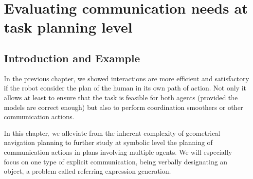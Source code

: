\documentclass[a4paper,11pt,twoside]{StyleThese}
\begin{document}
\setcounter{chapter}{2} %
\dominitoc
\faketableofcontents
\fi

\chapter{Evaluating communication needs at task planning level}
\minitoc
\printnomenclature

\section{Introduction and Example}
In the previous chapter, we showed interactions are more efficient and satisfactory if the robot consider the plan of the human in its own path of action. Not only it allows at least to ensure that the task is feasible for both agents (provided the models are correct enough) but also to perform coordination smoothers or other communication actions.

In this chapter, we alleviate from the inherent complexity of geometrical navigation planning to further study at symbolic level the planning of communication actions in plans involving multiple agents. We will especially focus on one type of explicit communication, being verbally designating an object, a problem called referring expression generation.
\end{document}
